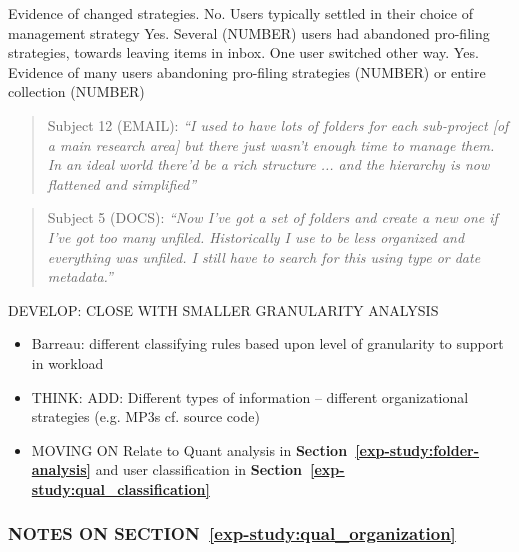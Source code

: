 \noindent
Evidence of changed strategies. No. Users typically settled in their choice of management strategy	Yes. Several (NUMBER) users had abandoned pro-filing strategies, towards leaving items in inbox. One user  switched  other way.	Yes. Evidence of many users  abandoning pro-filing strategies (NUMBER) or entire collection (NUMBER)

\begin{quote}
	Subject 12 (EMAIL): \textit{``I used to have lots of folders for each sub-project [of a main research area] but there just wasn't enough time to manage them. In an ideal world there'd be a rich structure ... and the hierarchy is now flattened and simplified''}
\end{quote}

\begin{quote}
	Subject 5 (DOCS): \textit{``Now I've got a set of folders and create a new one if I've got too many unfiled.  Historically I use to be less organized and everything was unfiled.  I still have to search for this using type or date metadata.''}
\end{quote}

\noindent
DEVELOP: CLOSE WITH SMALLER GRANULARITY ANALYSIS
\begin{itemize}
	\item Barreau: different classifying rules based upon level of granularity to support in workload
	\item THINK: ADD: Different types of information -- different organizational strategies (e.g. MP3s cf. source code)
	\item MOVING ON Relate to Quant analysis in \textbf{Section~\ref{exp-study:folder-analysis}} and user classification in \textbf{Section~\ref{exp-study:qual_classification}}
\end{itemize}




\noindent
\subsubsection*{NOTES ON SECTION~\ref{exp-study:qual_organization}}

